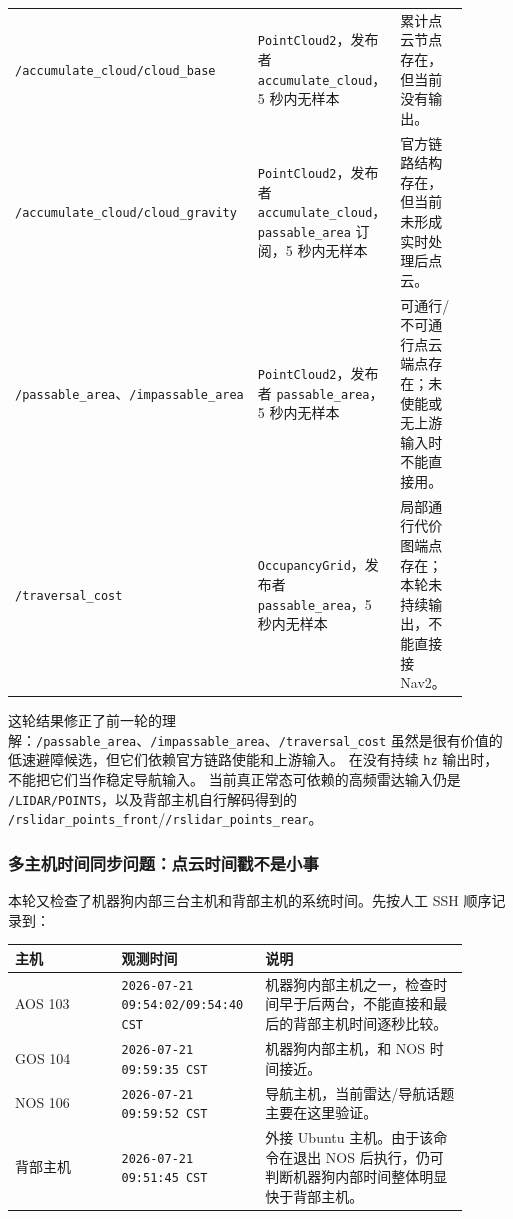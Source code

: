\documentclass[UTF8,11pt,a4paper]{ctexart}
\begin{document}
\begin{center}
\begin{tabular}{p{0.28\linewidth}p{0.28\linewidth}p{0.34\linewidth}}
\texttt{/accumulate\_cloud/cloud\_base} &
\texttt{PointCloud2}，发布者 \texttt{accumulate\_cloud}，5 秒内无样本 &
累计点云节点存在，但当前没有输出。\\
\texttt{/accumulate\_cloud/cloud\_gravity} &
\texttt{PointCloud2}，发布者 \texttt{accumulate\_cloud}，\texttt{passable\_area} 订阅，5 秒内无样本 &
官方链路结构存在，但当前未形成实时处理后点云。\\
\texttt{/passable\_area}、\texttt{/impassable\_area} &
\texttt{PointCloud2}，发布者 \texttt{passable\_area}，5 秒内无样本 &
可通行/不可通行点云端点存在；未使能或无上游输入时不能直接用。\\
\texttt{/traversal\_cost} &
\texttt{OccupancyGrid}，发布者 \texttt{passable\_area}，5 秒内无样本 &
局部通行代价图端点存在；本轮未持续输出，不能直接接 Nav2。\\
\bottomrule
\end{tabular}
\end{center}

这轮结果修正了前一轮的理解：\texttt{/passable\_area}、\texttt{/impassable\_area}、\texttt{/traversal\_cost}
虽然是很有价值的低速避障候选，但它们依赖官方链路使能和上游输入。
在没有持续 \texttt{hz} 输出时，不能把它们当作稳定导航输入。
当前真正常态可依赖的高频雷达输入仍是 \texttt{/LIDAR/POINTS}，以及背部主机自行解码得到的
\texttt{/rslidar\_points\_front}/\texttt{/rslidar\_points\_rear}。

\subsubsection{多主机时间同步问题：点云时间戳不是小事}

本轮又检查了机器狗内部三台主机和背部主机的系统时间。先按人工 SSH 顺序记录到：

\begin{center}
\renewcommand{\arraystretch}{1.18}
\begin{tabular}{p{0.22\linewidth}p{0.26\linewidth}p{0.42\linewidth}}
\toprule
\textbf{主机} & \textbf{观测时间} & \textbf{说明}\\
\midrule
AOS 103 & \texttt{2026-07-21 09:54:02/09:54:40 CST} & 机器狗内部主机之一，检查时间早于后两台，不能直接和最后的背部主机时间逐秒比较。\\
GOS 104 & \texttt{2026-07-21 09:59:35 CST} & 机器狗内部主机，和 NOS 时间接近。\\
NOS 106 & \texttt{2026-07-21 09:59:52 CST} & 导航主机，当前雷达/导航话题主要在这里验证。\\
背部主机 & \texttt{2026-07-21 09:51:45 CST} & 外接 Ubuntu 主机。由于该命令在退出 NOS 后执行，仍可判断机器狗内部时间整体明显快于背部主机。\\
\bottomrule
\end{tabular}
\end{center}
\end{document}
